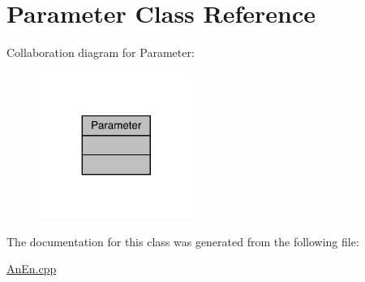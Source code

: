 \hypertarget{class_parameter}{}\section{Parameter Class Reference}
\label{class_parameter}


Collaboration diagram for Parameter\+:
\nopagebreak
\begin{figure}[H]
\begin{center}
\leavevmode
\includegraphics[width=143pt]{class_parameter__coll__graph}
\end{center}
\end{figure}


The documentation for this class was generated from the following file\+:\begin{DoxyCompactItemize}
\item 
\mbox{\hyperlink{_an_en_8cpp}{An\+En.\+cpp}}\end{DoxyCompactItemize}
